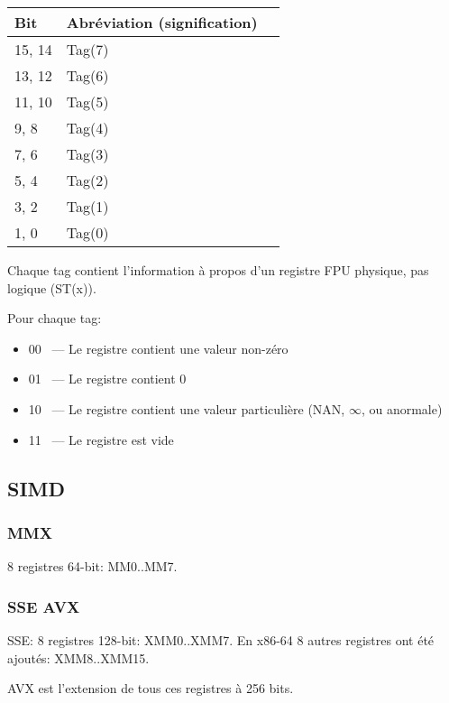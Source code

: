 \begin{center}
\begin{tabular}{ | l | l | l | }
\hline
Bit & Abréviation (signification) \\
\hline
15, 14 & Tag(7) \\
\hline
13, 12 & Tag(6) \\
\hline
11, 10 & Tag(5) \\
\hline
9, 8 & Tag(4) \\
\hline
7, 6 & Tag(3) \\
\hline
5, 4 & Tag(2) \\
\hline
3, 2 & Tag(1) \\
\hline
1, 0 & Tag(0) \\
\hline
\end{tabular}
\end{center}

Chaque tag contient l'information à propos d'un registre FPU physique, pas logique (ST(x)).

Pour chaque tag:

\begin{itemize}
\item 00 ~--- Le registre contient une valeur non-zéro
\item 01 ~--- Le registre contient 0
\item 10 ~--- Le registre contient une valeur particulière (\ac{NAN}, $\infty$, ou anormale)
\item 11 ~--- Le registre est vide
\end{itemize}

\subsection{\registers{} SIMD}

\subsubsection{\registers{} MMX}

8 registres 64-bit: MM0..MM7.

\subsubsection{\registers{} SSE \AndENRU AVX}

SSE: 8 registres 128-bit: XMM0..XMM7.
En x86-64 8 autres registres ont été ajoutés: XMM8..XMM15.

AVX est l'extension de tous ces registres à 256 bits.



